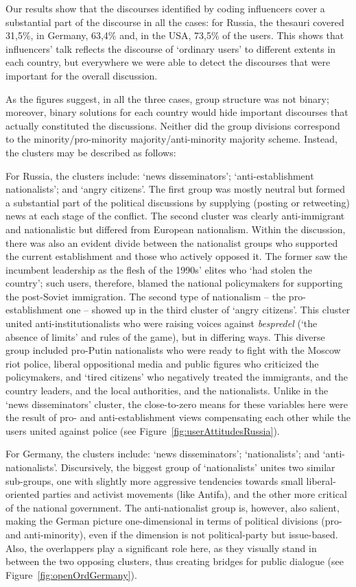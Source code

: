 Our results show that the discourses identified by coding influencers cover a substantial part of the discourse in all the cases: for Russia, the thesauri covered 31,5\%, in Germany, 63,4\% and, in the USA, 73,5\% of the users. This shows that influencers’ talk reflects the discourse of ‘ordinary users’ to different extents in each country, but everywhere we were able to detect the discourses that were important for the overall discussion.

As the figures suggest, in all the three cases, group structure was not binary; moreover, binary solutions for each country would hide important discourses that actually constituted the discussions. Neither did the group divisions correspond to the minority/pro-minority majority/anti-minority majority scheme. Instead, the clusters may be described as follows:

For Russia, the clusters include: ‘news disseminators’; ‘anti-establishment nationalists’; and ‘angry citizens’. The first group was mostly neutral but formed a substantial part of the political discussions by supplying (posting or retweeting) news at each stage of the conflict. The second cluster was clearly anti-immigrant and nationalistic but differed from European nationalism. Within the discussion, there was also an evident divide between the nationalist groups who supported the current establishment and those who actively opposed it. The former saw the incumbent leadership as the flesh of the 1990s’ elites who ‘had stolen the country’; such users, therefore, blamed the national policymakers for supporting the post-Soviet immigration. The second type of nationalism -- the pro-establishment one -- showed up in the third cluster of ‘angry citizens’. This cluster united anti-institutionalists who were raising voices against \textit{bespredel} (‘the absence of limits’ and rules of the game), but in differing ways. This diverse group included pro-Putin nationalists who were ready to fight with the Moscow riot police, liberal oppositional media and public figures who criticized the policymakers, and ‘tired citizens’ who negatively treated the immigrants, and the country leaders, and the local authorities, and the nationalists. Unlike in the ‘news disseminators’ cluster, the close-to-zero means for these variables here were the result of pro- and anti-establishment views compensating each other while the users united against police (see Figure~\cref{fig:userAttitudesRussia}).

For Germany, the clusters include: ‘news disseminators’; ‘nationalists’; and ‘anti-nationalists’. Discursively, the biggest group of ‘nationalists’ unites two similar sub-groups, one with slightly more aggressive tendencies towards small liberal-oriented parties and activist movements (like Antifa), and the other more critical of the national government. The anti-nationalist group is, however, also salient, making the German picture one-dimensional in terms of political divisions (pro- and anti-minority), even if the dimension is not political-party but issue-based. Also, the overlappers play a significant role here, as they visually stand in between the two opposing clusters, thus creating bridges for public dialogue (see Figure~\cref{fig:openOrdGermany}).

